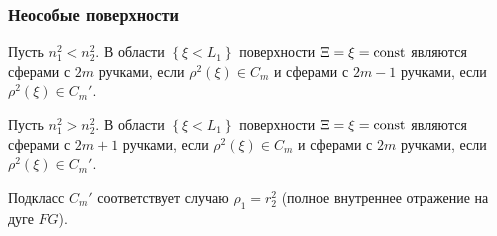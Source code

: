 \begin{frame}\frametitle{Неособые поверхности}
\begin{mytheorem}
Пусть $n_1^2<n_2^2$. В области $\left\{\xi < L_1\right\}$ поверхности $\Xi = \xi =  \mathrm{const}$ являются сферами с $2m$ ручками, если $\rho^2(\xi) \in C_m$ и сферами с $2m-1$ ручками, если $\rho^2(\xi) \in C_m'$.
\end{mytheorem}

\begin{mytheorem}
Пусть $n_1^2>n_2^2$. В области $\left\{\xi < L_1\right\}$ поверхности $\Xi = \xi =  \mathrm{const}$ являются сферами с $2m+1$ ручками, если $\rho^2(\xi) \in C_m$ и сферами с $2m$ ручками, если $\rho^2(\xi) \in C_m'$.
\end{mytheorem}


\qq  Подкласс $C_m'$ соответствует случаю $\rho_1 = r_2^2$ (полное внутреннее отражение на дуге $FG$).
\end{frame}


%
%
%
%
%
%

